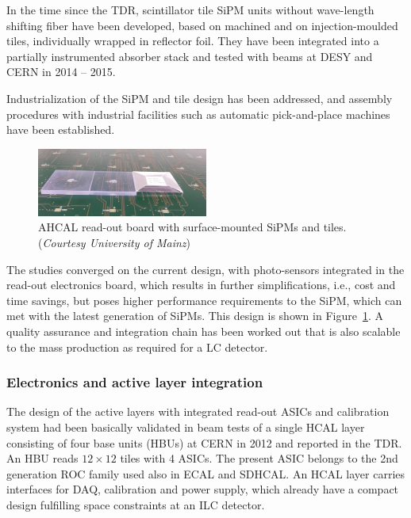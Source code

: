 In the time since the TDR, scintillator tile SiPM units without wave-length shifting fiber have been developed, based on machined and on injection-moulded tiles, individually wrapped in reflector foil. They have been integrated into a partially instrumented absorber stack and tested with beams at DESY and CERN in 2014 -- 2015.

Industrialization of the SiPM and tile design has been addressed, and assembly procedures with industrial facilities such as automatic pick-and-place machines have been established. 

\begin{figure}
	\centering
	\includegraphics[width=0.5\textwidth]{Calorimeter/AHCAL/SurfaceMountedTiles}
	\caption{AHCAL read-out board with surface-mounted SiPMs and tiles. ({\it Courtesy University of Mainz})}
	\label{fig:Calorimeter:AHCAL:HBU}
\end{figure}

The studies converged on the current design, with photo-sensors integrated in the read-out electronics board, which results in further simplifications, i.e., cost and time savings, but poses higher performance requirements to the SiPM, which can met with the latest generation of SiPMs. This design is shown in Figure~\ref{fig:Calorimeter:AHCAL:HBU}. A quality assurance and integration chain has been worked out that is also scalable to the mass production as required for a LC detector.

\subsubsection{Electronics and active layer integration}

The design of the active layers with integrated read-out ASICs and calibration system had been basically validated in beam tests of a single HCAL layer consisting of four base units (HBUs) at CERN in 2012 and reported in the TDR. An HBU reads $12 \times 12$ tiles with 4 ASICs. The present ASIC belongs to the 2nd generation ROC family used also in ECAL and SDHCAL. An HCAL layer carries interfaces for DAQ, calibration and power supply, which already have a compact design fulfilling space constraints at an ILC detector.

